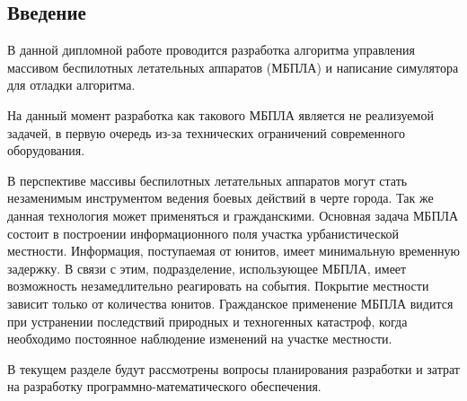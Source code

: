 \subsection{Введение}

В данной дипломной работе проводится разработка алгоритма управления
массивом беспилотных летательных аппаратов (МБПЛА) и написание
симулятора для отладки алгоритма.

На данный момент разработка как такового МБПЛА является не реализуемой
задачей, в первую очередь из-за технических ограничений современного
оборудования.

В перспективе массивы беспилотных летательных аппаратов могут стать
незаменимым инструментом ведения боевых действий в черте города.
Так же данная технология может применяться и гражданскими. Основная
задача МБПЛА состоит в построении информационного поля участка
урбанистической местности. Информация, поступаемая от юнитов, имеет
минимальную временную задержку. В связи с этим, подразделение,
использующее МБПЛА, имеет возможность незамедлительно реагировать
на события. Покрытие местности зависит только от количества юнитов.
Гражданское применение МБПЛА видится при устранении последствий
природных и техногенных катастроф, когда необходимо постоянное
наблюдение изменений на участке местности.

В текущем разделе будут рассмотрены вопросы планирования разработки
и затрат на разработку программно-математического обеспечения.
